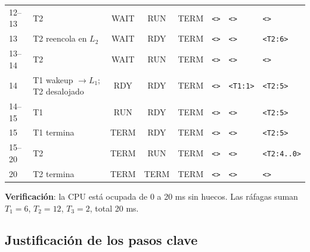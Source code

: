 \documentclass[11pt,a4paper]{article}
\begin{document}
\begin{center}
\begin{tabular}{@{}llcccp{2.5cm}p{1.55cm}p{1.4cm}@{}}
12--13 & T2             & WAIT & RUN & TERM & \texttt{<>}                & \texttt{<>}        & \texttt{<>}      \\
13    & T2 reencola en $L_2$ & WAIT & RDY & TERM & \texttt{<>}           & \texttt{<>}        & \texttt{<T2:6>}  \\
13--14 & T2             & WAIT & RUN & TERM & \texttt{<>}                & \texttt{<>}        & \texttt{<>}      \\
14    & T1 wakeup $\to L_1$; T2 desalojado & RDY & RDY & TERM & \texttt{<>} & \texttt{<T1:1>} & \texttt{<T2:5>} \\
14--15 & T1             & RUN  & RDY & TERM & \texttt{<>}                & \texttt{<>}        & \texttt{<T2:5>}  \\
15    & T1 termina      & TERM & RDY & TERM & \texttt{<>}                & \texttt{<>}        & \texttt{<T2:5>}  \\
15--20 & T2             & TERM & RUN & TERM & \texttt{<>}                & \texttt{<>}        & \texttt{<T2:4..0>} \\
20    & T2 termina      & TERM & TERM & TERM & \texttt{<>}               & \texttt{<>}        & \texttt{<>}      \\
\bottomrule
\end{tabular}
\end{center}

\textbf{Verificación}: la CPU está ocupada de 0 a 20 ms sin huecos.
Las ráfagas suman $T_1 = 6$, $T_2 = 12$, $T_3 = 2$, total 20 ms.

\subsection*{Justificación de los pasos clave}
\end{document}
